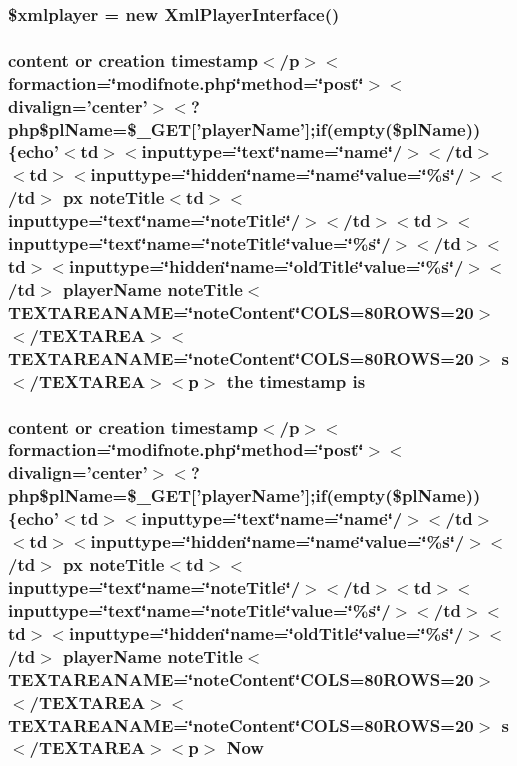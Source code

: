 \subsubsection{\setlength{\rightskip}{0pt plus 5cm}\$xmlplayer = new {\bf Xml\-Player\-Interface}()}\label{modifnote_8php_84a5cd74f81647949339a8f179d5d7b1}


\subsubsection{\setlength{\rightskip}{0pt plus 5cm}content or creation timestamp$<$/p$>$$<$formaction=\char`\"{}modifnote.php\char`\"{}method=\char`\"{}post\char`\"{}$>$$<$divalign='center'$>$$<$?php\$pl\-Name=\$\_\-GET['player\-Name'];if(empty(\$pl\-Name))\{echo'$<$td$>$$<$inputtype=\char`\"{}text\char`\"{}name=\char`\"{}name\char`\"{}/$>$$<$/td$>$$<$td$>$$<$inputtype=\char`\"{}hidden\char`\"{}name=\char`\"{}name\char`\"{}value=\char`\"{}\%s\char`\"{}/$>$$<$/td$>$ px note\-Title$<$td$>$$<$inputtype=\char`\"{}text\char`\"{}name=\char`\"{}note\-Title\char`\"{}/$>$$<$/td$>$$<$td$>$$<$inputtype=\char`\"{}text\char`\"{}name=\char`\"{}note\-Title\char`\"{}value=\char`\"{}\%s\char`\"{}/$>$$<$/td$>$$<$td$>$$<$inputtype=\char`\"{}hidden\char`\"{}name=\char`\"{}old\-Title\char`\"{}value=\char`\"{}\%s\char`\"{}/$>$$<$/td$>$ player\-Name note\-Title$<$TEXTAREANAME=\char`\"{}note\-Content\char`\"{}COLS=80ROWS=20$>$$<$/TEXTAREA$>$$<$TEXTAREANAME=\char`\"{}note\-Content\char`\"{}COLS=80ROWS=20$>$ s$<$/TEXTAREA$>$$<$p$>$ the timestamp is}\label{modifnote_8php_f5671694013f1fb1974c2584554091c7}


\subsubsection{\setlength{\rightskip}{0pt plus 5cm}content or creation timestamp$<$/p$>$$<$formaction=\char`\"{}modifnote.php\char`\"{}method=\char`\"{}post\char`\"{}$>$$<$divalign='center'$>$$<$?php\$pl\-Name=\$\_\-GET['player\-Name'];if(empty(\$pl\-Name))\{echo'$<$td$>$$<$inputtype=\char`\"{}text\char`\"{}name=\char`\"{}name\char`\"{}/$>$$<$/td$>$$<$td$>$$<$inputtype=\char`\"{}hidden\char`\"{}name=\char`\"{}name\char`\"{}value=\char`\"{}\%s\char`\"{}/$>$$<$/td$>$ px note\-Title$<$td$>$$<$inputtype=\char`\"{}text\char`\"{}name=\char`\"{}note\-Title\char`\"{}/$>$$<$/td$>$$<$td$>$$<$inputtype=\char`\"{}text\char`\"{}name=\char`\"{}note\-Title\char`\"{}value=\char`\"{}\%s\char`\"{}/$>$$<$/td$>$$<$td$>$$<$inputtype=\char`\"{}hidden\char`\"{}name=\char`\"{}old\-Title\char`\"{}value=\char`\"{}\%s\char`\"{}/$>$$<$/td$>$ player\-Name note\-Title$<$TEXTAREANAME=\char`\"{}note\-Content\char`\"{}COLS=80ROWS=20$>$$<$/TEXTAREA$>$$<$TEXTAREANAME=\char`\"{}note\-Content\char`\"{}COLS=80ROWS=20$>$ s$<$/TEXTAREA$>$$<$p$>$ Now}\label{modifnote_8php_6c139a3a380c29c953facd4183e5991b}


